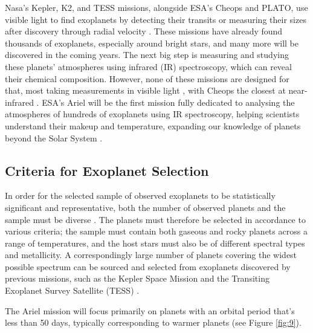 \documentclass[12pt]{article}
\begin{document}
Nasa's Kepler, K2, and TESS missions, alongside ESA's Cheops and PLATO, use visible light to find exoplanets by detecting their transits or measuring their sizes after discovery through radial velocity \cite{ARIEL_M4_Proposal}.
These missions have already found thousands of exoplanets, especially around bright stars, and many more will be discovered in the coming years. The next big step is measuring and studying these planets' atmospheres using infrared (IR) spectroscopy, which can reveal their chemical composition.
However, none of these missions are designed for that, most taking measurements in visible light \cite{platofact,keplerfact} \cite[p.8]{tessfact}, with Cheops the closest at near-infrared \cite[p.4]{fortier2024cheops}.
ESA's Ariel will be the first mission fully dedicated to analysing the atmospheres of hundreds of exoplanets using IR spectroscopy, helping scientists understand their makeup and temperature, expanding our knowledge of planets beyond the Solar System \cite{salvignol2024ariel,ARIEL_M4_Proposal}.

\subsection{Criteria for Exoplanet Selection}

In order for the selected sample of observed exoplanets to be statistically significant and representative, both the number of observed planets and the sample must be diverse \cite{zingales2018ariel}.
The planets must therefore be selected in accordance to various criteria; the sample must contain both gaseous and rocky planets across a range of temperatures, and the host stars must also be of
different spectral types and metallicity. A correspondingly large number of planets covering the widest possible spectrum can be sourced and selected from exoplanets discovered by previous missions, such as
the Kepler Space Mission \cite{zingales2018ariel} and the Transiting Exoplanet Survey Satellite (TESS) \cite{arielTESScandidates}.

The Ariel mission will focus primarily on planets with an orbital period that's less than 50 days, typically corresponding to warmer planets (see Figure \ref{fig:9}). 
\end{document}
